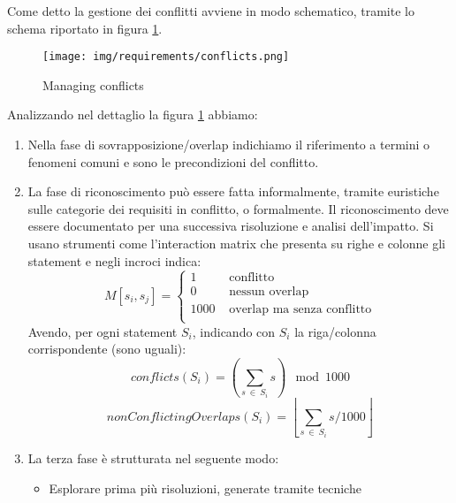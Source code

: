 Come detto la gestione dei conflitti avviene in modo schematico, tramite lo
schema riportato in figura \ref{fig:conflicts}.
\begin{figure}[!ht]
      \centering
      \texttt{[image: img/requirements/conflicts.png]}
      \caption{Managing conflicts}
      \label{fig:conflicts}
\end{figure}
Analizzando nel dettaglio la figura \ref{fig:conflicts} abbiamo:
\begin{enumerate}
      \item Nella fase di sovrapposizione/overlap indichiamo il riferimento a
            termini o fenomeni comuni e sono le precondizioni del conflitto.
      \item La fase di riconoscimento può essere fatta informalmente, tramite
            euristiche sulle categorie dei requisiti in conflitto, o formalmente. Il
            riconoscimento deve essere documentato per una successiva risoluzione e analisi
            dell'impatto. Si usano strumenti come l'interaction matrix che presenta su
            righe e colonne gli statement e negli incroci indica:
            \begin{equation}
                  M[s_i,s_j] = \begin{cases}
                        1    & \text{ conflitto}                  \\
                        0    & \text{ nessun overlap}             \\
                        1000 & \text{ overlap ma senza conflitto} \\
                  \end{cases}
            \end{equation}
            Avendo, per ogni statement $S_i$, indicando con $S_i$ la riga/colonna
            corrispondente (sono uguali):
            \begin{equation}
                  conflicts(S_i) = \left(\sum_{s \ \in \ S_i} s \right) \mod 1000
            \end{equation}
            \begin{equation}
                  nonConflictingOverlaps(S_i) = \left\lfloor \sum_{s \ \in \ S_i} s / 1000 \right\rfloor
            \end{equation}
      \item La terza fase è strutturata nel seguente modo:
            \begin{itemize}
                  \item Esplorare prima più risoluzioni, generate tramite tecniche

\end{itemize}
\end{enumerate}
